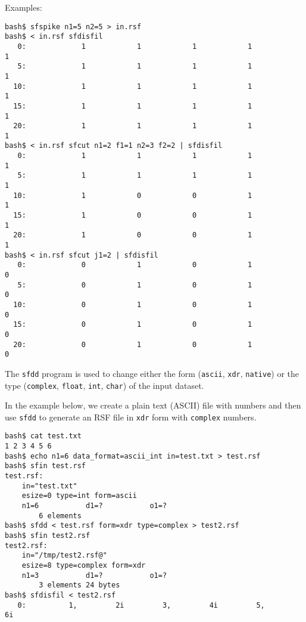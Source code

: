 Examples:
\begin{verbatim}
bash$ sfspike n1=5 n2=5 > in.rsf
bash$ < in.rsf sfdisfil
   0:             1            1            1            1            1
   5:             1            1            1            1            1
  10:             1            1            1            1            1
  15:             1            1            1            1            1
  20:             1            1            1            1            1
bash$ < in.rsf sfcut n1=2 f1=1 n2=3 f2=2 | sfdisfil
   0:             1            1            1            1            1
   5:             1            1            1            1            1
  10:             1            0            0            1            1
  15:             1            0            0            1            1
  20:             1            0            0            1            1
bash$ < in.rsf sfcut j1=2 | sfdisfil
   0:             0            1            0            1            0
   5:             0            1            0            1            0
  10:             0            1            0            1            0
  15:             0            1            0            1            0
  20:             0            1            0            1            0
\end{verbatim}

\noindent\doublebox{\parbox{\textwidth}{

}}

The \texttt{sfdd} program is used to change either the form (\texttt{ascii},
\texttt{xdr}, \texttt{native}) or the type (\texttt{complex}, \texttt{float},
\texttt{int}, \texttt{char}) of the input dataset. 

In the example below, we create a plain text (ASCII) file with numbers and
then use \texttt{sfdd} to generate an RSF file in \texttt{xdr} form with
\texttt{complex} numbers. 
\begin{verbatim}
bash$ cat test.txt
1 2 3 4 5 6
bash$ echo n1=6 data_format=ascii_int in=test.txt > test.rsf
bash$ sfin test.rsf
test.rsf:
    in="test.txt"
    esize=0 type=int form=ascii
    n1=6           d1=?           o1=?
        6 elements
bash$ sfdd < test.rsf form=xdr type=complex > test2.rsf
bash$ sfin test2.rsf
test2.rsf:
    in="/tmp/test2.rsf@"
    esize=8 type=complex form=xdr
    n1=3           d1=?           o1=?
        3 elements 24 bytes
bash$ sfdisfil < test2.rsf
   0:          1,         2i         3,         4i         5,         6i
\end{verbatim}

